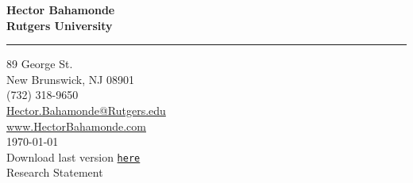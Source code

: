 \documentclass[11pt]{letter} %
\date{}
\begin{document}

\begin{letter}{} 


\begin{center}
\large\bf Hector Bahamonde \\ %
Rutgers University\\
\vspace{20pt} \hrule height 1pt %
89 George St. \\ New Brunswick, NJ 08901 \\ (732) 318-9650 \\ 
{\normalfont\normalsize\href{mailto:hector.bahamonde@rutgers.edu}{Hector.Bahamonde@Rutgers.edu}} \\
{\normalfont\normalsize\href{http://www.hectorbahamonde.com}{www.HectorBahamonde.com}}\\
{\normalfont \scriptsize{
\vspace{5mm}\today\\
Download last version \href{http://github.com/hbahamonde/Job_Market/raw/master/Bahamonde_Research_Statement.pdf}{\texttt{\color{red}here}}}} %
\\
{\huge\vspace{3mm} Research Statement}
\end{center} 


\opening{} 
 

\end{letter}
\end{document}
